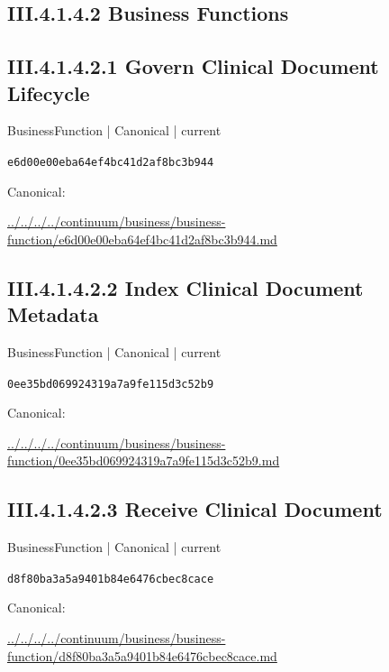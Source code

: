 \documentclass[10pt,a4paper]{article}
\begin{document}
\subsection*{III.4.1.4.2 Business Functions}
\subsection*{III.4.1.4.2.1 Govern Clinical Document Lifecycle}
\label{element-e6d00e00eba64ef4bc41d2af8bc3b944}
{\small BusinessFunction | Canonical | current}\par
\texttt{e6d00e00eba64ef4bc41d2af8bc3b944}\par
Canonical: \par
{\footnotesize\url{../../../../continuum/business/business-function/e6d00e00eba64ef4bc41d2af8bc3b944.md}}\par
\subsection*{III.4.1.4.2.2 Index Clinical Document Metadata}
\label{element-0ee35bd069924319a7a9fe115d3c52b9}
{\small BusinessFunction | Canonical | current}\par
\texttt{0ee35bd069924319a7a9fe115d3c52b9}\par
Canonical: \par
{\footnotesize\url{../../../../continuum/business/business-function/0ee35bd069924319a7a9fe115d3c52b9.md}}\par
\subsection*{III.4.1.4.2.3 Receive Clinical Document}
\label{element-d8f80ba3a5a9401b84e6476cbec8cace}
{\small BusinessFunction | Canonical | current}\par
\texttt{d8f80ba3a5a9401b84e6476cbec8cace}\par
Canonical: \par
{\footnotesize\url{../../../../continuum/business/business-function/d8f80ba3a5a9401b84e6476cbec8cace.md}}\par
\end{document}
